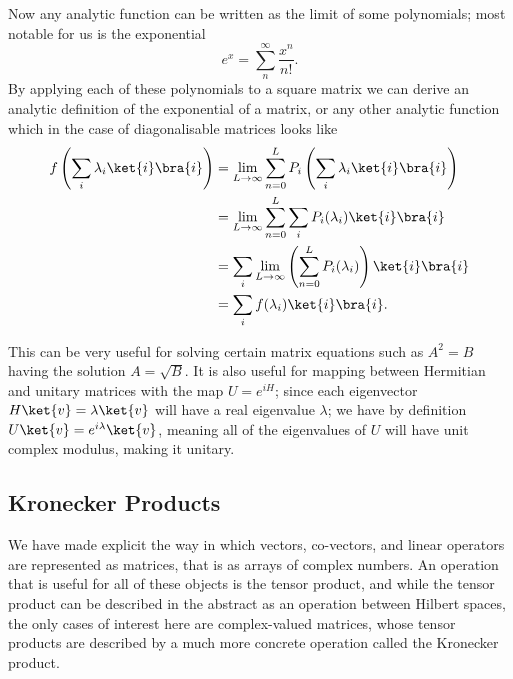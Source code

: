 Now any analytic function can be written as the limit of some polynomials; most notable for us is the exponential
\[e^x = \sum_n^\infty \frac{x^n}{n!}.\]
By applying each of these polynomials to a square matrix we can derive an analytic definition of the exponential of a matrix, or any other analytic function which in the case of diagonalisable matrices looks like
\begin{align*}
	f\left(\sum_i \lambda_i\ket{i}\bra{i}\right)
	&= \lim_{L \to \infty} \sum_{n=0}^L P_i\left(\sum_i \lambda_i\ket{i}\bra{i}\right)
	\\&= \lim_{L \to \infty} \sum_{n=0}^L \sum_i P_i(\lambda_i)\ket{i}\bra{i}
	\\&= \sum_i \lim_{L \to \infty} \left(\sum_{n=0}^L  P_i(\lambda_i)\right)\ket{i}\bra{i}
	\\&= \sum_i f(\lambda_i)\ket{i}\bra{i}.
\end{align*}

This can be very useful for solving certain matrix equations such as $A^2 = B$ having the solution $A = \sqrt{B}$. It is also useful for mapping between Hermitian and unitary matrices with the map $U = e^{iH}$; since each eigenvector $H\ket{v} = \lambda\ket{v}$ will have a real eigenvalue $\lambda$; we have by definition $U\ket{v} = e^{i\lambda}\ket{v}$, meaning all of the eigenvalues of $U$ will have unit complex modulus, making it unitary.

\subsection{Kronecker Products}
We have made explicit the way in which vectors, co-vectors, and linear operators are represented as matrices, that is as arrays of complex numbers. An operation that is useful for all of these objects is the tensor product, and while the tensor product can be described in the abstract as an operation between Hilbert spaces, the only cases of interest here are complex-valued matrices, whose tensor products are described by a much more concrete operation called the Kronecker product.

